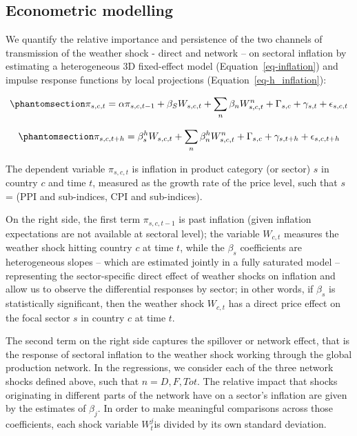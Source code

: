 \documentclass[
  letterpaper,
  DIV=11,
  numbers=noendperiod]{scrartcl}
\begin{document}
\subsection{Econometric modelling}\label{econometric-modelling}

We quantify the relative importance and persistence of the two channels
of transmission of the weather shock - direct and network -- on sectoral
inflation by estimating a heterogeneous 3D fixed-effect model
(Equation~\ref{eq-inflation}) and impulse response functions by local
projections (Equation~\ref{eq-h_inflation}):

\begin{equation}\phantomsection\label{eq-inflation}{
\pi_{s,c,t} = \alpha\pi_{s,c,t-1} + \beta_SW_{s,c,t} + \sum_n\beta_n W_{s,c,t}^n + \Gamma_{s,c}+ \gamma_{s,t}+ \epsilon_{s,c,t}     
}\end{equation}

\begin{equation}\phantomsection\label{eq-h_inflation}{
\pi_{s,c,t+h} = \beta_{s}^h W_{s,c,t} + \sum_n\beta_n^hW_{s,c,t}^n + \Gamma_{s,c} + \gamma_{s,t+h} + \epsilon_{s,c,t+h}             
}\end{equation}

The dependent variable \(\pi_{s,c,t}\) is inflation in product category
(or sector) \(s\) in country \(c\) and time \(t\), measured as the
growth rate of the price level, such that \(s\) = (PPI and sub-indices,
CPI and sub-indices).

On the right side, the first term \(\pi_{s,c,t-1}\) is past inflation
(given inflation expectations are not available at sectoral level); the
variable \(W_{c,t}\) measures the weather shock hitting country \(c\) at
time \(t\), while the \(\beta_s\) coefficients are heterogeneous slopes
-- which are estimated jointly in a fully saturated model --
representing the sector-specific direct effect of weather shocks on
inflation and allow us to observe the differential responses by sector;
in other words, if \(\beta_s\) is statistically significant, then the
weather shock \(W_{c,t}\) has a direct price effect on the focal sector
\(s\) in country \(c\) at time \(t\).

The second term on the right side captures the spillover or network
effect, that is the response of sectoral inflation to the weather shock
working through the global production network. In the regressions, we
consider each of the three network shocks defined above, such that
\(n = 𝐷, F, 𝑇𝑜𝑡\). The relative impact that shocks originating in
different parts of the network have on a sector's inflation are given by
the estimates of \(\beta_j\). In order to make meaningful comparisons
across those coefficients, each shock variable \(W_t^j\)is divided by
its own standard deviation.
\end{document}

